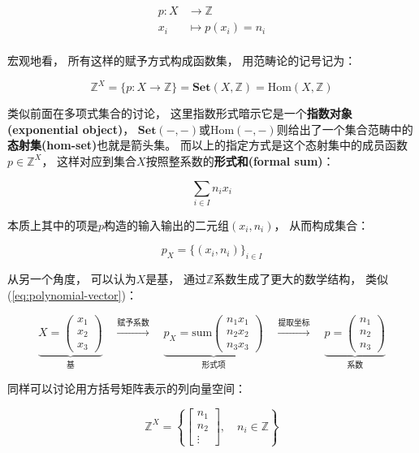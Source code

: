 \documentclass[10pt, openany]{book}
\begin{document}
$$
\begin{aligned}
p: X &\to \mathbb Z \\
x_i &\mapsto p(x_i) = n_i \\
\end{aligned}
$$

宏观地看，
所有这样的赋予方式构成函数集，
用范畴论的记号记为：

$$
\mathbb Z^X = \{p: X \to \mathbb Z\} = \textbf{Set}(X,\mathbb Z) = \text{Hom}(X,\mathbb Z) 
$$

类似前面在多项式集合的讨论，
这里指数形式暗示它是一个\textbf{指数对象(exponential object)}，
$\textbf{Set}(-,-)$或$\text{Hom}(-,-)$则给出了一个集合范畴中的\textbf{态射集(hom-set)}也就是箭头集。
而以上的指定方式是这个态射集中的成员函数$p\in \mathbb Z^X$，
这样对应到集合$X$按照整系数的\textbf{形式和(formal sum)}：

$$
\sum_{i\in I} n_i x_i
$$

本质上其中的项是$p$构造的输入输出的二元组$(x_i,n_i)$，
从而构成集合：

$$
p_X = \{ (x_i,n_i) \}_{i\in I}
$$

从另一个角度，
可以认为$X$是基，
通过$\mathbb Z$系数生成了更大的数学结构，
类似(\ref{eq:polynomial-vector})：

\begin{equation}
\underbrace{X=\begin{pmatrix}x_1 \\ x_2 \\ x_3\end{pmatrix}}_{\text{基}}
\quad \xrightarrow{\text{赋予系数}} \quad
\underbrace{p_X=\text{sum}\begin{pmatrix}n_1 x_1 \\ n_2 x_2 \\ n_3 x_3\end{pmatrix}}_{\text{形式项}}
\quad \xrightarrow{\text{提取坐标}} \quad
\underbrace{p=\begin{pmatrix}n_1 \\ n_2 \\ n_3\end{pmatrix}}_{\text{系数}}
\end{equation}\label{eq:formal-sum-vector}

同样可以讨论用方括号矩阵表示的列向量空间：

$$
\mathbb Z^X = \left\{ \begin{bmatrix} n_1 \\ n_2 \\ \vdots \end{bmatrix}, \quad n_i \in \mathbb Z \right\}
$$
\end{document}
